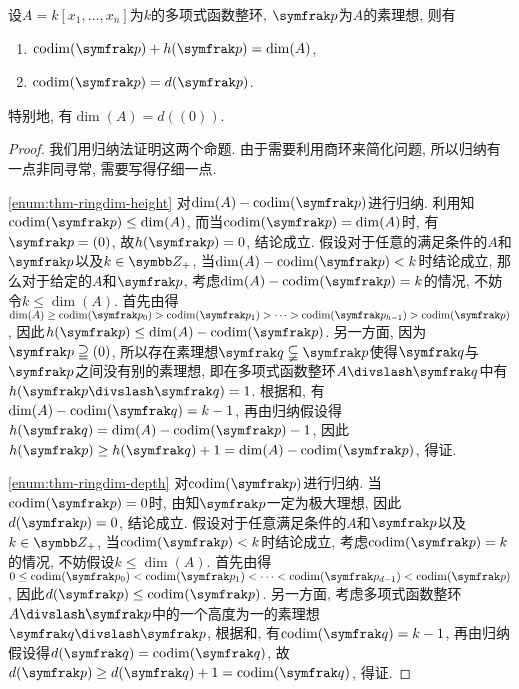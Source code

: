 \begin{theorem}\label{thm:ringdim}
  设$A=k[x_1, \dotsc, x_n]$为$k$的多项式函数整环, $\ideal{p}$为$A$的素理想, 则有
  \begin{enumerate}
    \item\label{enum:thm-ringdim-height} $\codim(\ideal{p})+h(\ideal{p})=\dim (A)$,
    \item\label{enum:thm-ringdim-depth} $\codim(\ideal{p})=d(\ideal{p})$.
  \end{enumerate}
  特别地, 有$\dim (A) = d((0))$.
\end{theorem}

\begin{proof}
  我们用归纳法证明这两个命题. 由于需要利用商环来简化问题, 所以归纳有一点非同寻常, 需要写得仔细一点.

  \ref{enum:thm-ringdim-height} 对$\dim (A)-\codim (\ideal{p})$进行归纳. 利用知$\codim (\ideal{p})\leq \dim (A)$, 而当$\codim (\ideal{p})=\dim (A)$时, 有$\ideal{p}=(0)$, 故$h(\ideal{p})=0$, 结论成立. 假设对于任意的满足条件的$A$和$\ideal{p}$以及$k\in\ZZ_+$, 当$\dim (A)-\codim (\ideal{p})< k$时结论成立, 那么对于给定的$A$和$\ideal{p}$, 考虑$\dim (A)-\codim (\ideal{p})=k$的情况, 不妨令$k\leq \dim (A)$. 首先由得$\dim (A)\geq\codim (\ideal{p}_0)>\codim (\ideal{p}_1)>\dotsb >\codim (\ideal{p}_{h-1})>\codim (\ideal{p})$, 因此$h(\ideal{p})\leq \dim (A)-\codim (\ideal{p})$. 另一方面, 因为$\ideal{p}\supseteqq (0)$, 所以存在素理想$\ideal{q}\subsetneqq \ideal{p}$使得$\ideal{q}$与$\ideal{p}$之间没有别的素理想, 即在多项式函数整环$A{\divslash}\ideal{q}$中有$h(\ideal{p}{\divslash}\ideal{q})=1$. 根据和, 有$\dim (A)-\codim (\ideal{q})=k-1$, 再由归纳假设得$h(\ideal{q})=\dim (A)-\codim (\ideal{p})-1$, 因此$h(\ideal{p})\geq h(\ideal{q})+1 = \dim (A)-\codim (\ideal{p})$, 得证.

  \ref{enum:thm-ringdim-depth} 对$\codim (\ideal{p})$进行归纳. 当$\codim (\ideal{p})=0$时, 由知$\ideal{p}$一定为极大理想, 因此$d(\ideal{p})=0$, 结论成立. 假设对于任意满足条件的$A$和$\ideal{p}$以及$k\in\ZZ_+$, 当$\codim(\ideal{p})<k$时结论成立, 考虑$\codim(\ideal{p})=k$的情况, 不妨假设$k\leq \dim (A)$. 首先由得 $0\leq\codim (\ideal{p}_0)<\codim (\ideal{p}_1)<\dotsb <\codim (\ideal{p}_{d-1})<\codim (\ideal{p})$, 因此$d(\ideal{p})\leq \codim (\ideal{p})$. 另一方面, 考虑多项式函数整环$A{\divslash}\ideal{p}$中的一个高度为一的素理想$\ideal{q}{\divslash}\ideal{p}$, 根据和, 有$\codim (\ideal{q})=k-1$, 再由归纳假设得$d(\ideal{q})=\codim (\ideal{q})$, 故$d(\ideal{p})\geq d(\ideal{q})+1=\codim (\ideal{q})$, 得证.
\end{proof}

